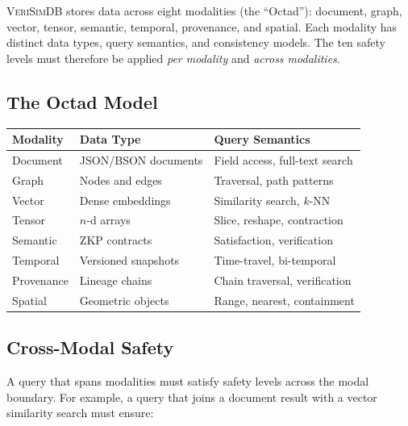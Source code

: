 \documentclass[11pt,a4paper]{article}
\newcommand{\VeriSimDB}{\textsc{VeriSimDB}}
\begin{document}
\VeriSimDB{} stores data across eight modalities (the ``Octad''):
document, graph, vector, tensor, semantic, temporal, provenance, and
spatial.  Each modality has distinct data types, query semantics, and
consistency models.  The ten safety levels must therefore be applied
\emph{per modality} and \emph{across modalities}.

\subsection{The Octad Model}

\begin{center}
\begin{tabular}{lll}
\toprule
\textbf{Modality} & \textbf{Data Type} & \textbf{Query Semantics} \\
\midrule
Document   & JSON/BSON documents & Field access, full-text search \\
Graph      & Nodes and edges     & Traversal, path patterns \\
Vector     & Dense embeddings    & Similarity search, $k$-NN \\
Tensor     & $n$-d arrays        & Slice, reshape, contraction \\
Semantic   & ZKP contracts       & Satisfaction, verification \\
Temporal   & Versioned snapshots & Time-travel, bi-temporal \\
Provenance & Lineage chains      & Chain traversal, verification \\
Spatial    & Geometric objects   & Range, nearest, containment \\
\bottomrule
\end{tabular}
\end{center}

\subsection{Cross-Modal Safety}

A query that spans modalities must satisfy safety levels across the
modal boundary.  For example, a query that joins a document result
with a vector similarity search must ensure:
\end{document}
